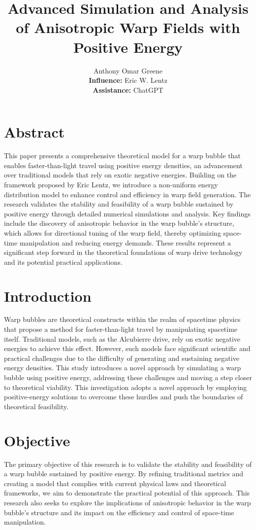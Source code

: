 \documentclass{article}
\title{Advanced Simulation and Analysis of Anisotropic Warp Fields with Positive Energy}
\author{Anthony Omar Greene \\ \textbf{Influence:} Eric W. Lentz \\ \textbf{Assistance:} ChatGPT}
\date{}
\begin{document}
\maketitle

\section*{Abstract}
This paper presents a comprehensive theoretical model for a warp bubble that enables faster-than-light travel using positive energy densities, an advancement over traditional models that rely on exotic negative energies. Building on the framework proposed by Eric Lentz, we introduce a non-uniform energy distribution model to enhance control and efficiency in warp field generation. The research validates the stability and feasibility of a warp bubble sustained by positive energy through detailed numerical simulations and analysis. Key findings include the discovery of anisotropic behavior in the warp bubble's structure, which allows for directional tuning of the warp field, thereby optimizing space-time manipulation and reducing energy demands. These results represent a significant step forward in the theoretical foundations of warp drive technology and its potential practical applications.

\section*{Introduction}
Warp bubbles are theoretical constructs within the realm of spacetime physics that propose a method for faster-than-light travel by manipulating spacetime itself. Traditional models, such as the Alcubierre drive, rely on exotic negative energies to achieve this effect. However, such models face significant scientific and practical challenges due to the difficulty of generating and sustaining negative energy densities. This study introduces a novel approach by simulating a warp bubble using positive energy, addressing these challenges and moving a step closer to theoretical viability. This investigation adopts a novel approach by employing positive-energy solutions to overcome these hurdles and push the boundaries of theoretical feasibility.

\section*{Objective}
The primary objective of this research is to validate the stability and feasibility of a warp bubble sustained by positive energy. By refining traditional metrics and creating a model that complies with current physical laws and theoretical frameworks, we aim to demonstrate the practical potential of this approach. This research also seeks to explore the implications of anisotropic behavior in the warp bubble's structure and its impact on the efficiency and control of space-time manipulation.
\end{document}
